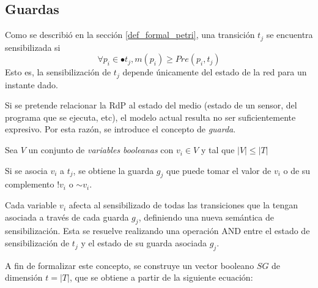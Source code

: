 \subsection{Guardas}
\label{guardas}


Como se describió en la sección \ref{def_formal_petri}, una transición $t_{j}$
se encuentra sensibilizada si $$ \forall p_{i} \in \bullet t_{j}, m(p_i) \geq Pre(p_{i}, t_{j}) $$
Esto es, la sensibilización de $t_{j}$ depende únicamente del estado de
la red para un instante dado.

Si se pretende relacionar la RdP al estado del medio (estado de un sensor, del
programa que se ejecuta, etc), el modelo actual resulta no ser suficientemente
expresivo. Por esta razón, se introduce el concepto de \textit{guarda}.

Sea $V$ un conjunto de \textit{variables booleanas} con $v_{i} \in V$ y tal que
$\left\vert V \right\vert \leq \left\vert T \right\vert$

Si se asocia $v_{i}$ a $t_{j}$, se obtiene la guarda $g_{j}$ que puede tomar el
valor de $v_{i}$ o de su complemento $!v_{i}$ o $\mathtt{\sim} v_{i}$.

Cada variable $v_{i}$ afecta al sensibilizado de todas las transiciones que la
tengan asociada a través de cada guarda $g_{j}$, definiendo una nueva semántica
de sensibilización. Esta se resuelve realizando una operación AND entre el
estado de sensibilización de $t_{j}$ y el estado de su guarda asociada $g_{j}$.

A fin de formalizar este concepto, se construye un vector booleano $SG$ de
dimensión $t = \left\vert{T}\right\vert$, que se obtiene a partir de la
siguiente ecuación:

